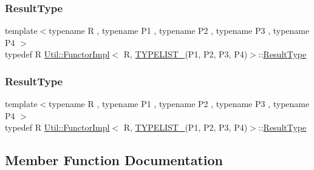 \subsubsection{\texorpdfstring{ResultType}{ResultType}\hspace{0.1cm}{\footnotesize\ttfamily [1/2]}}
{\footnotesize\ttfamily template$<$typename R , typename P1 , typename P2 , typename P3 , typename P4 $>$ \\
typedef R \mbox{\hyperlink{classUtil_1_1FunctorImpl}{Util\+::\+Functor\+Impl}}$<$ R, \mbox{\hyperlink{install_2include_2adat_2typelist_8h_a7a156c571ab21a16b0495e1c882a07fa}{T\+Y\+P\+E\+L\+I\+S\+T\+\_}}(P1, P2, P3, P4)$>$\+::\mbox{\hyperlink{structUtil_1_1Private_1_1FunctorImplBase_a5e95fd30fdd89f3c5080b68ab5891bc3}{Result\+Type}}}

\mbox{\label{classUtil_1_1FunctorImpl_3_01R_00_01TYPELIST__4_07P1_00_01P2_00_01P3_00_01P4_08_4_a9218a4b4370d688d3e144a75e5d24cfe}} 
\subsubsection{\texorpdfstring{ResultType}{ResultType}\hspace{0.1cm}{\footnotesize\ttfamily [2/2]}}
{\footnotesize\ttfamily template$<$typename R , typename P1 , typename P2 , typename P3 , typename P4 $>$ \\
typedef R \mbox{\hyperlink{classUtil_1_1FunctorImpl}{Util\+::\+Functor\+Impl}}$<$ R, \mbox{\hyperlink{install_2include_2adat_2typelist_8h_a7a156c571ab21a16b0495e1c882a07fa}{T\+Y\+P\+E\+L\+I\+S\+T\+\_}}(P1, P2, P3, P4)$>$\+::\mbox{\hyperlink{structUtil_1_1Private_1_1FunctorImplBase_a5e95fd30fdd89f3c5080b68ab5891bc3}{Result\+Type}}}



\subsection{Member Function Documentation}
\mbox{\label{classUtil_1_1FunctorImpl_3_01R_00_01TYPELIST__4_07P1_00_01P2_00_01P3_00_01P4_08_4_ad5c77ea15e9101b061099c9caaeba2be}} 
